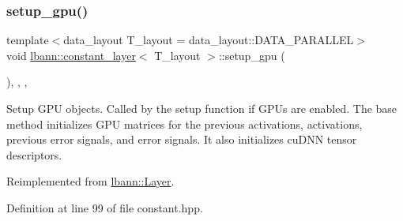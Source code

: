 \subsubsection{\texorpdfstring{setup\+\_\+gpu()}{setup\_gpu()}}
{\footnotesize\ttfamily template$<$data\+\_\+layout T\+\_\+layout = data\+\_\+layout\+::\+D\+A\+T\+A\+\_\+\+P\+A\+R\+A\+L\+L\+EL$>$ \\
void \hyperlink{classlbann_1_1constant__layer}{lbann\+::constant\+\_\+layer}$<$ T\+\_\+layout $>$\+::setup\+\_\+gpu (\begin{DoxyParamCaption}{ }\end{DoxyParamCaption})\hspace{0.3cm}{\ttfamily [inline]}, {\ttfamily [override]}, {\ttfamily [protected]}, {\ttfamily [virtual]}}

Setup G\+PU objects. Called by the setup function if G\+P\+Us are enabled. The base method initializes G\+PU matrices for the previous activations, activations, previous error signals, and error signals. It also initializes cu\+D\+NN tensor descriptors. 

Reimplemented from \hyperlink{classlbann_1_1Layer_a36aa22ef90ce4de65abe729d38490863}{lbann\+::\+Layer}.



Definition at line 99 of file constant.\+hpp.


